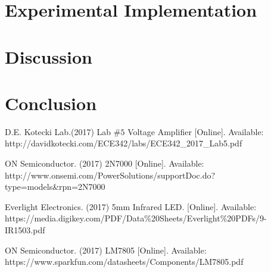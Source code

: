 \documentclass{article}
\begin{document}
    

     
 
    
  \section{Experimental Implementation}
  	

    
  \section{Discussion}
     
    
    
    \section{Conclusion}
        

    
    \newpage
\clearpage

\appendix

\begin{thebibliography}{00}

 D.E. Kotecki Lab.(2017) Lab $\#5$ Voltage Amplifier [Online]. Available: http://davidkotecki.com/ECE342/labs/ECE342\_2017\_Lab5.pdf
\newline

 ON Semiconductor. (2017) 2N7000 [Online]. Available: http://www.onsemi.com/PowerSolutions/supportDoc.do?type=models\&rpn=2N7000
\newline

 Everlight Electronics. (2017) 5mm Infrared LED. [Online]. Available:
https://media.digikey.com/PDF/Data\%20Sheets/Everlight\%20PDFs/9-IR1503.pdf
\newline

 ON Semiconductor. (2017) LM7805 [Online]. Available: 
https://www.sparkfun.com/datasheets/Components/LM7805.pdf
\newline

\end{thebibliography}
\end{document}
